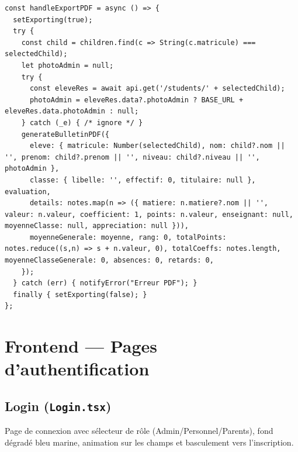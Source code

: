 \documentclass[12pt,a4paper]{article}
\begin{document}
\begin{lstlisting}[style=code]
const handleExportPDF = async () => {
  setExporting(true);
  try {
    const child = children.find(c => String(c.matricule) === selectedChild);
    let photoAdmin = null;
    try {
      const eleveRes = await api.get('/students/' + selectedChild);
      photoAdmin = eleveRes.data?.photoAdmin ? BASE_URL + eleveRes.data.photoAdmin : null;
    } catch (_e) { /* ignore */ }
    generateBulletinPDF({
      eleve: { matricule: Number(selectedChild), nom: child?.nom || '', prenom: child?.prenom || '', niveau: child?.niveau || '', photoAdmin },
      classe: { libelle: '', effectif: 0, titulaire: null }, evaluation,
      details: notes.map(n => ({ matiere: n.matiere?.nom || '', valeur: n.valeur, coefficient: 1, points: n.valeur, enseignant: null, moyenneClasse: null, appreciation: null })),
      moyenneGenerale: moyenne, rang: 0, totalPoints: notes.reduce((s,n) => s + n.valeur, 0), totalCoeffs: notes.length, moyenneClasseGenerale: 0, absences: 0, retards: 0,
    });
  } catch (err) { notifyError("Erreur PDF"); }
  finally { setExporting(false); }
};
\end{lstlisting}

\newpage

\section{Frontend --- Pages d'authentification}

\subsection{Login (\texttt{Login.tsx})}

Page de connexion avec sélecteur de rôle (Admin/Personnel/Parents), fond dégradé bleu marine, animation sur les champs et basculement vers l'inscription.
\end{document}
